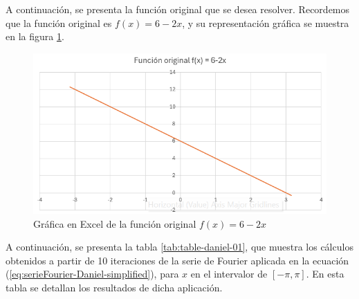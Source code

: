 {A continuación, se presenta la función original que se desea resolver. Recordemos que la función original es \(f(x)=6-2x\), y su representación gráfica se muestra en la figura \ref{fig:figure-danielexcel-01}.

\vspace{10pt}

\begin{figure}[H]
    \centering
    \includegraphics[width=\linewidth]{Figures/fourierDaniel/Funcion original.png}
    \caption[Gráfica en Excel de la función original \(f(x)=6-2x\)]{Gráfica en Excel de la función original \(f(x)=6 - 2x\)}  %
    \label{fig:figure-danielexcel-01}
\end{figure}

\vspace{10pt}

A continuación, se presenta la tabla \ref{tab:table-daniel-01}, que muestra los cálculos obtenidos a partir de 10 iteraciones de la serie de Fourier aplicada en la ecuación (\ref{eq:serieFourier-Daniel-simplified}), para \(x\) en el intervalor de \([-\pi,\pi]\). En esta tabla se detallan los resultados de dicha aplicación.

}
